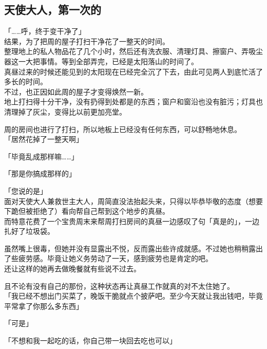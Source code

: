 \subsection{天使大人，第一次的}

「……呼，终于变干净了」\\

结果，为了把周的屋子打扫干净花了一整天的时间。\\

整理地上的私人物品花了几个小时，然后还有洗衣服、清理灯具、擦窗户、弄吸尘器这一大把事情。等到全部弄完，已经是太阳落山的时间了。\\

真昼过来的时候还能见到的太阳现在已经完全沉了下去，由此可见两人到底忙活了多长的时间。\\

不过，也正因如此周的屋子才变得焕然一新。\\

地上打扫得十分干净，没有扔得到处都是的东西；窗户和窗沿也没有脏污；灯具也清理掉了灰尘，变得比以前更加亮堂。

周的房间也进行了打扫，所以地板上已经没有任何东西，可以舒畅地休息。\\

「居然花掉了一整天啊」

「毕竟乱成那样嘛……」

「那是你搞成那样的」

「您说的是」\\

面对天使大人兼救世主大人，周简直没法抬起头来，只得以毕恭毕敬的态度（想要下跪但被拒绝了）看向帮自己帮到这个地步的真昼。\\

而特意花费了一个宝贵周末来帮周打扫房间的真昼一边感叹了句「真是的」，一边扎好了垃圾袋。

虽然嘴上很毒，但她并没有显露出不悦，反而露出些许成就感。不过她也稍稍露出了些疲劳感。毕竟让她义务劳动了一天，感到疲劳也是肯定的吧。\\

还让这样的她再去做晚餐就有些说不过去。

且不论有没有自己的那份，这种状态再让真昼工作就真的对不太住她了。\\%
 
「我已经不想出门买菜了，晚饭干脆就点个披萨吧。至少今天就让我出钱吧，毕竟平常拿了你那么多东西」

「可是」

「不想和我一起吃的话，你自己带一块回去吃也可以」\\

